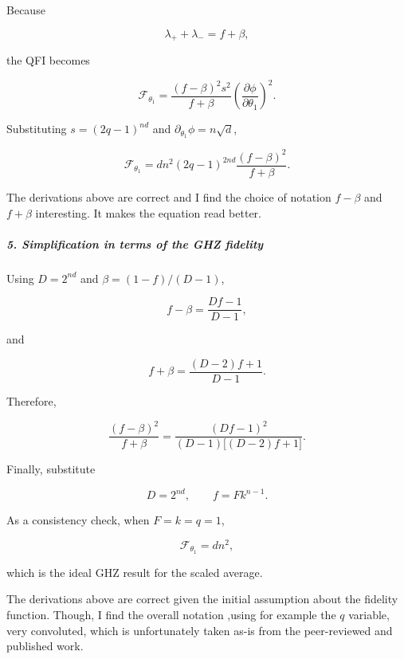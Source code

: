 Because

\[
\lambda_++\lambda_-=f+\beta,
\]

the QFI becomes

\[
\mathcal F_{\theta_1} = \frac{(f-\beta)^2s^2}{f+\beta} \left(\frac{\partial\phi}{\partial\theta_1}\right)^2.
\]

Substituting $s=(2q-1)^{nd}$ and $\partial_{\theta_1}\phi=n\sqrt d$,

\[
\mathcal F_{\theta_1} = dn^2(2q-1)^{2nd} \frac{(f-\beta)^2}{f+\beta}.
\]

{\color{blue}

The derivations above are correct and I find the choice of notation $f-\beta$ and $f+\beta$ interesting. It makes the equation read better.

}

\subparagraph*{5. Simplification in terms of the GHZ fidelity}

Using $D=2^{nd}$ and $\beta=(1-f)/(D-1)$,

\[
f-\beta = \frac{Df-1}{D-1},
\]

and

\[
f+\beta = \frac{(D-2)f+1}{D-1}.
\]

Therefore,

\[
\frac{(f-\beta)^2}{f+\beta} = \frac{(Df-1)^2} {(D-1)\bigl[(D-2)f+1\bigr]}.
\]

Finally, substitute

\[
D=2^{nd}, \qquad f=Fk^{n-1}.
\]

As a consistency check, when $F=k=q=1$,

\[
\mathcal F_{\theta_1}=dn^2,
\]

which is the ideal GHZ result for the scaled average.

{\color{blue}

The derivations above are correct given the initial assumption about the fidelity function. Though, I find the overall notation ,using for example the $q$ variable, very convoluted, which is unfortunately taken as-is from the peer-reviewed and published work.

}
